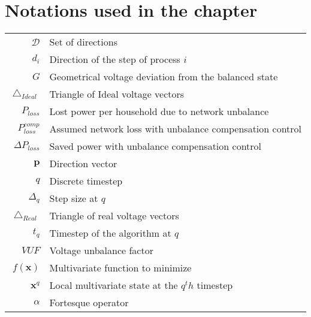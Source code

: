 \newpage
\section{Notations used in the chapter}
		
  \begin{scriptsize}
\begin{tabularx}{\textwidth}{r|X}
$\mathcal{D}$											& Set of directions\\
$d_i$                             & Direction of the step of process $i$\\
$G$                               & Geometrical voltage deviation from the balanced state\\

$\bigtriangleup_{Ideal}$          & Triangle of Ideal voltage vectors\\
$P_{loss}$                        & Lost power per household due to network unbalance\\
  $P^{comp}_{loss}$                 & Assumed network loss with unbalance compensation control\\
  $\Delta P_{loss}$                 & Saved power with unbalance compensation control\\
  $\textbf{p}$                      & Direction vector\\
  $q$                               & Discrete timestep\\
  $\Delta_q$                        & Step size at $q$\\
  $\bigtriangleup_{Real}$           & Triangle of real voltage vectors\\
  $t_q$                             & Timestep of the algorithm at $q$\\
  
  $VUF$                             & Voltage unbalance factor\\
  $f(\textbf{x})$										& Multivariate function to minimize\\
  $\textbf{x}^{q}$                           & Local multivariate state at the $q^th$ timestep\\
  
  $\alpha$													& Fortesque operator\\
\end{tabularx}
\end{scriptsize} 